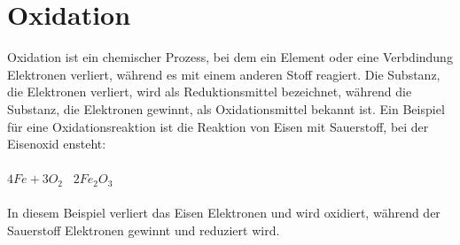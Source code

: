\section{Oxidation} \label{sec:oxidation}
Oxidation ist ein chemischer Prozess, bei dem ein Element oder eine Verbdindung Elektronen verliert,
während es mit einem anderen Stoff reagiert. 
Die Substanz, die Elektronen verliert,
wird als Reduktionsmittel bezeichnet, während die Substanz, 
die Elektronen gewinnt, als Oxidationsmittel bekannt ist.
Ein Beispiel für eine Oxidationsreaktion ist die Reaktion von Eisen mit Sauerstoff, bei der Eisenoxid ensteht:\\ \ \\
$4Fe + 3O_2$ \textrightarrow\ $2Fe_2O_3$ \\ \ \\
In diesem Beispiel verliert das Eisen Elektronen und wird oxidiert, während der Sauerstoff Elektronen gewinnt und reduziert wird.
